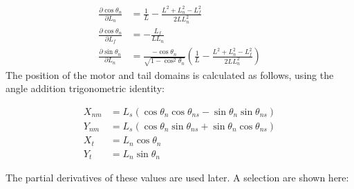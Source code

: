 \documentclass[9pt,twoside,lineno]{pnas-new}
\begin{document}
\begin{align}
  \frac{\partial \cos\theta_n}{\partial L_n} &= \frac{1}{L} - \frac{L^2 + L_n^2 - L_f^2}{2L L_n^2}\\
  \frac{\partial \cos\theta_n}{\partial L_f} &= -\frac{L_f}{LL_n}\\
  \frac{\partial \sin\theta_n}{\partial L_n} &= \frac{-\cos\theta_n}{\sqrt{1-\cos^2\theta_n}}
  \left(\frac{1}{L} - \frac{L^2 + L_n^2 - L_f^2}{2L L_n^2}\right)
\end{align}
%
The position of the motor and tail domains is calculated as follows, using the angle addition trigonometric identity:

\begin{align}
  X_{nm} &= L_s\left(
  \cos\theta_n\cos\theta_{ns} - \sin\theta_n\sin\theta_{ns}
  \right)
  \\
  Y_{nm} &= L_s\left(
  \cos\theta_n\sin\theta_{ns} + \sin\theta_n\cos\theta_{ns}
  \right)
  \\
  X_{t} &= L_n\cos\theta_n\\
  Y_{t} &= L_n\sin\theta_n
\end{align}

The partial derivatives of these values are used later. A selection are shown here:
\end{document}
